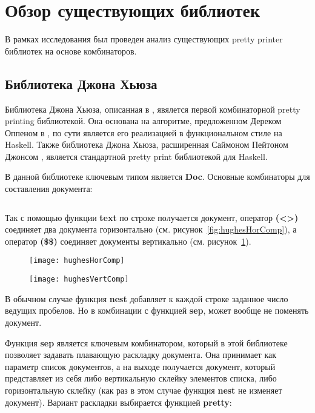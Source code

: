 \section{Обзор существующих библиотек}

В рамках исследования был проведен анализ существующих pretty printer библиотек на основе комбинаторов.

\subsection{Библиотека Джона Хьюза}

Библиотека Джона Хьюза, описанная в \cite{hughes}, явялется первой комбинаторной pretty printing библиотекой. Она основана на алгоритме, предложенном Дереком Оппеном в \cite{oppen}, по сути является его реализацией в функциональном стиле на Haskell. Также библиотека Джона Хьюза, расширенная Саймоном Пейтоном Джонсом \cite{peytonJones}, является стандартной pretty print библиотекой для Haskell.


В данной библиотеке ключевым типом является \textbf{Doc}. Основные комбинаторы для составления документа:
\inputminted{haskell}{codes/hughesBasicOperators.hs}

Так с помощью функции \textbf{text} по строке получается документ, оператор \textbf{(<>)} соединяет два документа горизонтально (см. рисунок~\ref{fig:hughesHorComp}), а оператор \textbf{(\$\$)} соединяет документы вертикально (см. рисунок~\ref{fig:hughesVertComp}).

\begin{figure}[h!]
	\begin{minipage}[b]{0.45\linewidth}
		\centering
		\texttt{[image: hughesHorComp]}
		\caption{}
		\label{fig:hughesHorComp}
	\end{minipage}
	\hspace{0.5cm}
	\begin{minipage}[b]{0.45\linewidth}
		\centering
		\texttt{[image: hughesVertComp]}
		\caption{}
		\label{fig:hughesVertComp}
	\end{minipage}
\end{figure}

В обычном случае функция \textbf{nest} добавляет к каждой строке заданное число ведущих пробелов. Но в комбинации с функцией \textbf{sep}, может вообще не поменять документ.

Функция \textbf{sep} является ключевым комбинатором, который в этой библиотеке позволяет задавать плавающую раскладку документа. Она принимает как параметр список документов, а на выходе получается документ, который представляет из себя либо вертикальную склейку элементов списка, либо горизонтальную склейку (как раз в этом случае функция \textbf{nest} не изменяет документ). Вариант раскладки выбирается функцией \textbf{pretty}:


